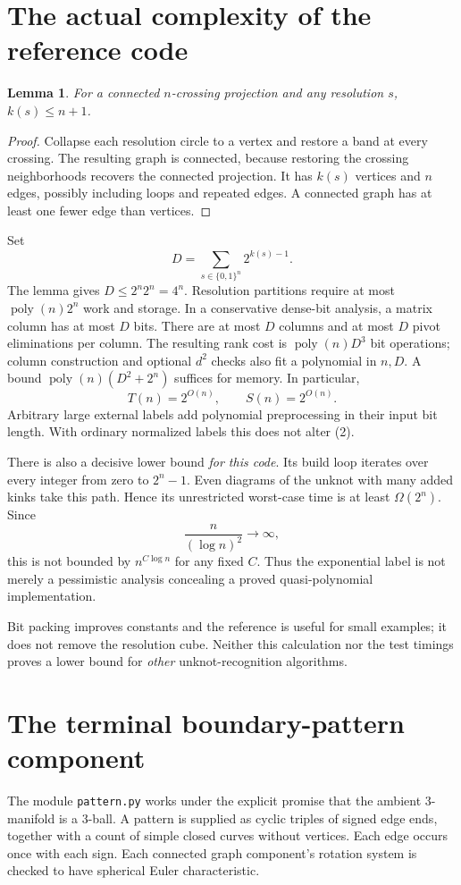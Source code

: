 \documentclass[11pt]{article}
\newtheorem{lemma}[theorem]{Lemma}
\theoremstyle{definition}
\newcommand{\code}[1]{\texttt{#1}}
\begin{document}
\section{The actual complexity of the reference code}
\begin{lemma}
For a connected $n$-crossing projection and any resolution $s$,
$k(s)\leq n+1$.
\end{lemma}
\begin{proof}
Collapse each resolution circle to a vertex and restore a band at every
crossing. The resulting graph is connected, because restoring the crossing
neighborhoods recovers the connected projection. It has $k(s)$ vertices and
$n$ edges, possibly including loops and repeated edges. A connected graph
has at least one fewer edge than vertices.
\end{proof}
Set
\[
 D=\sum_{s\in\{0,1\}^n}2^{k(s)-1}.
\]
The lemma gives $D\leq 2^n2^n=4^n$. Resolution partitions require at most
$\operatorname{poly}(n)2^n$ work and storage. In a conservative dense-bit
analysis, a matrix column has at most $D$ bits. There are at most $D$ columns
and at most $D$ pivot eliminations per column. The resulting rank cost is
$\operatorname{poly}(n)D^3$ bit operations; column construction and optional
$d^2$ checks also fit a polynomial in $n,D$. A bound
$\operatorname{poly}(n)(D^2+2^n)$ suffices for memory. In particular,
\[
 T(n)=2^{O(n)},\qquad S(n)=2^{O(n)}.             \tag{2}
\]
Arbitrary large external labels add polynomial preprocessing in their input
bit length. With ordinary normalized labels this does not alter (2).

There is also a decisive lower bound \emph{for this code}. Its build loop
iterates over every integer from zero to $2^n-1$. Even diagrams of the unknot
with many added kinks take this path. Hence its unrestricted worst-case time
is at least $\Omega(2^n)$. Since
\[
 \frac{n}{(\log n)^2}\longrightarrow\infty,
\]
this is not bounded by $n^{C\log n}$ for any fixed $C$. Thus the exponential
label is not merely a pessimistic analysis concealing a proved
quasi-polynomial implementation.

Bit packing improves constants and the reference is useful for small examples;
it does not remove the resolution cube. Neither this calculation nor the
test timings proves a lower bound for \emph{other} unknot-recognition
algorithms.

\section{The terminal boundary-pattern component}
The module \code{pattern.py} works under the explicit promise that the ambient
3-manifold is a 3-ball. A pattern is supplied as cyclic triples of signed edge
ends, together with a count of simple closed curves without vertices. Each
edge occurs once with each sign. Each connected graph component's rotation
system is checked to have spherical Euler characteristic.
\end{document}
